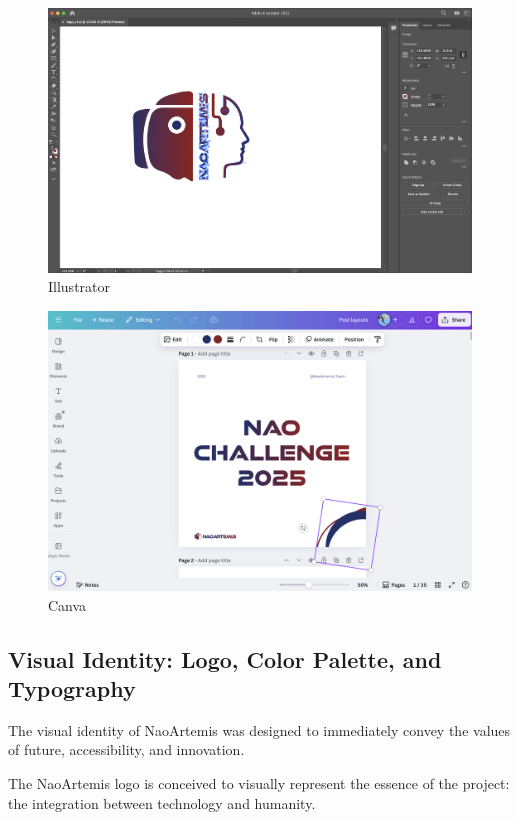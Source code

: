 \documentclass{optica-article}
\begin{document}
\begin{figure}[h]
  \centering
  \includegraphics[width=\textwidth]{figures/illustrator.png}
  \caption{Illustrator}
  \label{fig:py3_01}
\end{figure}

\begin{figure}[H]
  \centering
  \includegraphics[width=\textwidth]{figures/canva.png}
  \caption{Canva}
  \label{fig:py3_01}
\end{figure}

\subsection{Visual Identity: Logo, Color Palette, and Typography}
The visual identity of NaoArtemis was designed to immediately convey the values of future, accessibility, and innovation.

The NaoArtemis logo is conceived to visually represent the essence of the project: the integration between technology and humanity.
\end{document}
